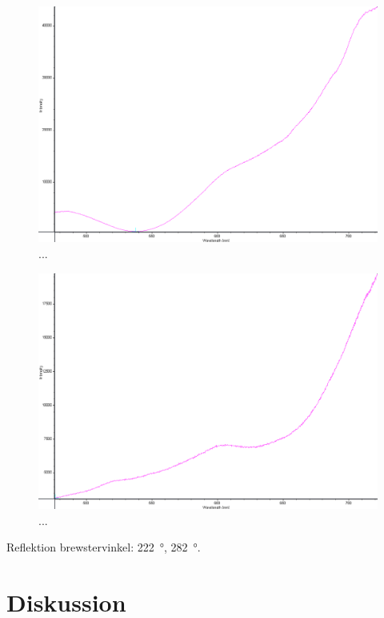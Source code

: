 \documentclass[a4paper]{article}
\begin{document}
\FloatBarrier
\begin{figure}[h!]
	\centering
	\includegraphics[width=\linewidth]{data/spektra_aktiv3_inv}
	\caption{...}
	\label{fig:}
\end{figure}
\FloatBarrier

\FloatBarrier
\begin{figure}[h!]
	\centering
	\includegraphics[width=\linewidth]{data/spektra_kristall1_optAx_inv}
	\caption{...}
	\label{fig:}
\end{figure}
\FloatBarrier

Reflektion brewstervinkel: \SI{222}{\degree}, \SI{282}{\degree}.

\section{Diskussion}

 
 {}
 
\end{document}
